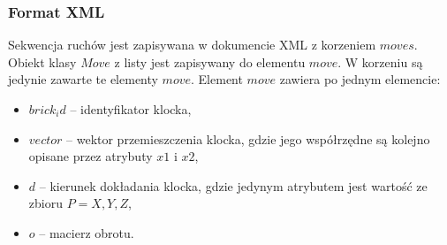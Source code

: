\documentclass[12pt]{article}
\begin{document}
\subsubsection{Format XML}
Sekwencja ruchów jest zapisywana w dokumencie XML z korzeniem $moves$.
Obiekt klasy $Move$ z listy jest zapisywany do elementu $move$. W korzeniu
są jedynie zawarte te elementy $move$. Element $move$ zawiera po jednym
elemencie:
\begin{itemize}
	\item $brick_id$ -- identyfikator klocka,
	\item $vector$ -- wektor przemieszczenia klocka, gdzie jego współrzędne
		są kolejno opisane przez atrybuty $x1$ i $x2$,
	\item $d$ -- kierunek dokładania klocka, gdzie jedynym atrybutem
		jest wartość ze zbioru $P = {X,Y,Z}$,
	\item $o$ -- macierz obrotu.
\end{itemize}
\end{document}
